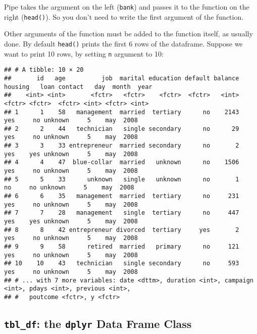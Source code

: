 \documentclass[]{book}
\newenvironment{Shaded}{\begin{snugshade}}{\end{snugshade}}
\newcommand{\KeywordTok}[1]{\textcolor[rgb]{0.13,0.29,0.53}{\textbf{{#1}}}}
\newcommand{\DataTypeTok}[1]{\textcolor[rgb]{0.13,0.29,0.53}{{#1}}}
\newcommand{\DecValTok}[1]{\textcolor[rgb]{0.00,0.00,0.81}{{#1}}}
\newcommand{\StringTok}[1]{\textcolor[rgb]{0.31,0.60,0.02}{{#1}}}
\newcommand{\NormalTok}[1]{{#1}}
\begin{document}
Pipe takes the argument on the left (\texttt{bank}) and passes it to the
function on the right (\texttt{head()}). So you don't need to write the
first argument of the function.

Other arguments of the function must be added to the function itself, as
usually done. By default \texttt{head()} prints the first 6 rows of the
dataframe. Suppose we want to print 10 rows, by setting \texttt{n}
argument to 10:

\begin{Shaded}
\end{Shaded}

\begin{verbatim}
## # A tibble: 10 × 20
##       id   age          job  marital education default balance housing   loan contact   day  month  year
##    <int> <int>       <fctr>   <fctr>    <fctr>  <fctr>   <int>  <fctr> <fctr>  <fctr> <int> <fctr> <int>
## 1      1    58   management  married  tertiary      no    2143     yes     no unknown     5    may  2008
## 2      2    44   technician   single secondary      no      29     yes     no unknown     5    may  2008
## 3      3    33 entrepreneur  married secondary      no       2     yes    yes unknown     5    may  2008
## 4      4    47  blue-collar  married   unknown      no    1506     yes     no unknown     5    may  2008
## 5      5    33      unknown   single   unknown      no       1      no     no unknown     5    may  2008
## 6      6    35   management  married  tertiary      no     231     yes     no unknown     5    may  2008
## 7      7    28   management   single  tertiary      no     447     yes    yes unknown     5    may  2008
## 8      8    42 entrepreneur divorced  tertiary     yes       2     yes     no unknown     5    may  2008
## 9      9    58      retired  married   primary      no     121     yes     no unknown     5    may  2008
## 10    10    43   technician   single secondary      no     593     yes     no unknown     5    may  2008
## # ... with 7 more variables: date <dttm>, duration <int>, campaign <int>, pdays <int>, previous <int>,
## #   poutcome <fctr>, y <fctr>
\end{verbatim}

\subsection{\texorpdfstring{\texttt{tbl\_df}: the \texttt{dplyr} Data
Frame
Class}{tbl\_df: the dplyr Data Frame Class}}\label{tbl_df-the-dplyr-data-frame-class}
\end{document}
